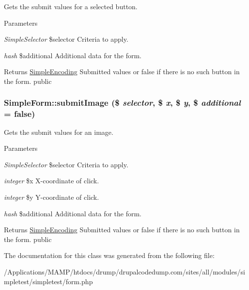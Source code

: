 \label{class_simple_form_a335273f023ff494045ab6d82072a5d9f}
Gets the submit values for a selected button. 
\begin{DoxyParams}{Parameters}
\item[{\em SimpleSelector}]\$selector Criteria to apply. \item[{\em hash}]\$additional Additional data for the form. \end{DoxyParams}
\begin{DoxyReturn}{Returns}
\hyperlink{class_simple_encoding}{SimpleEncoding} Submitted values or false if there is no such button in the form.  public 
\end{DoxyReturn}
\hypertarget{class_simple_form_a3070b07ce5bd0464ad0939acacc24045}{
\subsubsection[{submitImage}]{\setlength{\rightskip}{0pt plus 5cm}SimpleForm::submitImage (\$ {\em selector}, \/  \$ {\em x}, \/  \$ {\em y}, \/  \$ {\em additional} = {\ttfamily false})}}
\label{class_simple_form_a3070b07ce5bd0464ad0939acacc24045}
Gets the submit values for an image. 
\begin{DoxyParams}{Parameters}
\item[{\em SimpleSelector}]\$selector Criteria to apply. \item[{\em integer}]\$x X-\/coordinate of click. \item[{\em integer}]\$y Y-\/coordinate of click. \item[{\em hash}]\$additional Additional data for the form. \end{DoxyParams}
\begin{DoxyReturn}{Returns}
\hyperlink{class_simple_encoding}{SimpleEncoding} Submitted values or false if there is no such button in the form.  public 
\end{DoxyReturn}


The documentation for this class was generated from the following file:\begin{DoxyCompactItemize}
\item 
/Applications/MAMP/htdocs/drump/drupalcodedump.com/sites/all/modules/simpletest/simpletest/form.php\end{DoxyCompactItemize}
